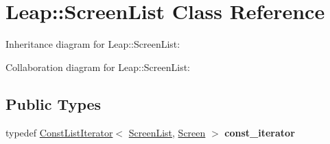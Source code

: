 \hypertarget{class_leap_1_1_screen_list}{}\section{Leap\+:\+:Screen\+List Class Reference}
\label{class_leap_1_1_screen_list}


Inheritance diagram for Leap\+:\+:Screen\+List\+:


Collaboration diagram for Leap\+:\+:Screen\+List\+:
\subsection*{Public Types}
\begin{DoxyCompactItemize}
\item 
\mbox{\label{class_leap_1_1_screen_list_aa5375d780cb454e661f94096dcefd431}} 
typedef \hyperlink{class_leap_1_1_const_list_iterator}{Const\+List\+Iterator}$<$ \hyperlink{class_leap_1_1_screen_list}{Screen\+List}, \hyperlink{class_leap_1_1_screen}{Screen} $>$ {\bfseries const\+\_\+iterator}
\end{DoxyCompactItemize}
